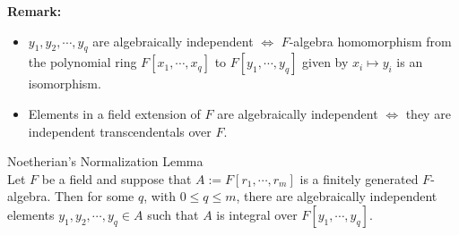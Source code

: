 \noindent\textbf{Remark:} \begin{itemize}
    \item $y_1,y_2 ,\cdots, y_q$ are algebraically independent $\Leftrightarrow$ $F$-algebra homomorphism from the polynomial ring $F[x_1 ,\cdots, x_q]$ to $F[y_1 ,\cdots, y_q]$ given by $x_i \mapsto y_i$ is an isomorphism.

    \item Elements in a field extension of $F$ are algebraically independent $\Leftrightarrow$ they are independent transcendentals over $F$.
\end{itemize}

\begin{theorem}{Noetherian's Normalization Lemma}\\
Let $F$ be a field and suppose that $A:= F[r_1 ,\cdots, r_m]$ is a finitely generated $F$-algebra. Then for some $q$, with $0 \leq q\leq m$, there are algebraically independent elements $y_1,y_2 ,\cdots, y_q \in A$ such that $A$ is integral over $F[y_1 ,\cdots, y_q]$.
\end{theorem}

